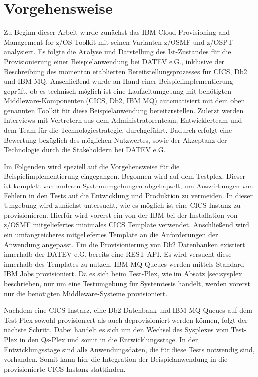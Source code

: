 \chapter{Vorgehensweise}\label{ch:vorgehensweise}
Zu Beginn dieser Arbeit wurde zunächst das \glqq IBM Cloud Provisioning and Management for z/OS\grqq-Toolkit mit seinen Varianten z/OSMF und z/OSPT analysiert.
Es folgte die Analyse und Darstellung des Ist-Zustandes für die  Provisionierung einer Beispielanwendung bei DATEV e.G., inklusive der Beschreibung des momentan etablierten Bereitstellungsprozesses für CICS, Db2 und IBM MQ.
Anschließend wurde an Hand einer Beispielimplementierung geprüft, ob es technisch möglich ist eine Laufzeitumgebung mit benötigten Middleware-Komponenten (CICS, Db2, IBM MQ) automatisiert mit dem oben genannten Toolkit für diese Beispielanwendung bereitzustellen.
Zuletzt werden Interviews mit Vertretern aus dem Administratorenteam, Entwicklerteam und dem Team für die Technologiestrategie, durchgeführt.
Dadurch erfolgt eine Bewertung bezüglich des möglichen Nutzwertes, sowie der Akzeptanz der Technologie durch die Stakeholdern bei DATEV e.G.

Im Folgenden wird speziell auf die Vorgehensweise für die Beispielimplementierung eingegangen. 
Begonnen wird auf dem Testplex.
Dieser ist komplett von anderen Systemumgebungen abgekapselt, um Auswirkungen von Fehlern in den Tests auf die Entwicklung und Produktion zu vermeiden.
In dieser Umgebung wird zunächst untersucht, wie es möglich ist eine CICS-Instanz zu provisionieren.
Hierfür wird vorerst ein von der IBM bei der Installation von z/OSMF mitgeliefertes minimales CICS Template verwendet.
Anschließend wird ein umfangreicheres mitgeliefertes Template an die Anforderungen der Anwendung angepasst.
Für die Provisionierung von Db2 Datenbanken existiert innerhalb der DATEV e.G. bereits eine REST-API.
Es wird versucht diese innerhalb des Templates zu nutzen.
IBM MQ Queues werden mittels Standard IBM Jobs provisioniert.
Da es sich beim Test-Plex, wie im Absatz \ref{sec:sysplex} beschrieben, nur um eine Testumgebung für Systemtests handelt, werden vorerst nur die benötigten Middleware-Systeme provisioniert.

Nachdem eine CICS-Instanz, eine Db2 Datenbank und IBM MQ Queues auf dem Test-Plex sowohl provisioniert als auch deprovisioniert werden können, folgt der nächste Schritt.
Dabei handelt es sich um den Wechsel des Sysplexes vom Test-Plex in den Qs-Plex und somit in die Entwicklungsstage.
In der Entwicklungsstage sind alle Anwendungsdaten, die für diese Tests notwendig sind, vorhanden.
Somit kann hier die Integration der Beispielanwendung in die provisionierte CICS-Instanz stattfinden.


